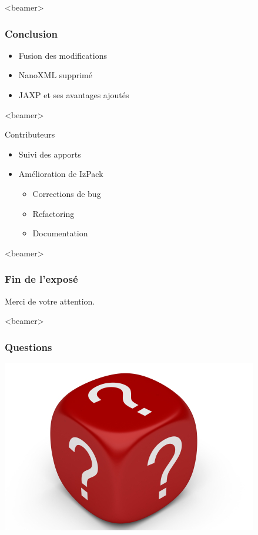 \begin{frame}<beamer>
\frametitle{Conclusion}
\begin{itemize}
	\item Fusion des modifications
	\item NanoXML supprimé
	\item JAXP et ses avantages ajoutés
\end{itemize}
\end{frame}
\begin{frame}<beamer>
\begin{beamerboxesrounded}[shadow=true]{Contributeurs}
\begin{itemize}
	\item Suivi des apports
	\item Amélioration de IzPack
	\begin{itemize}
		\item Corrections de bug
		\item Refactoring
		\item Documentation
	\end{itemize}
\end{itemize}
\end{beamerboxesrounded}
\end{frame}
\begin{frame}<beamer>\frametitle{Fin de l'exposé}
\begin{center}
\LARGE Merci de votre attention.
\end{center}
\end{frame}
\begin{frame}<beamer>\frametitle{Questions}
\begin{center}
\includegraphics[width=.6\linewidth]{../image/questionMark.jpg}
\end{center}
\end{frame}
